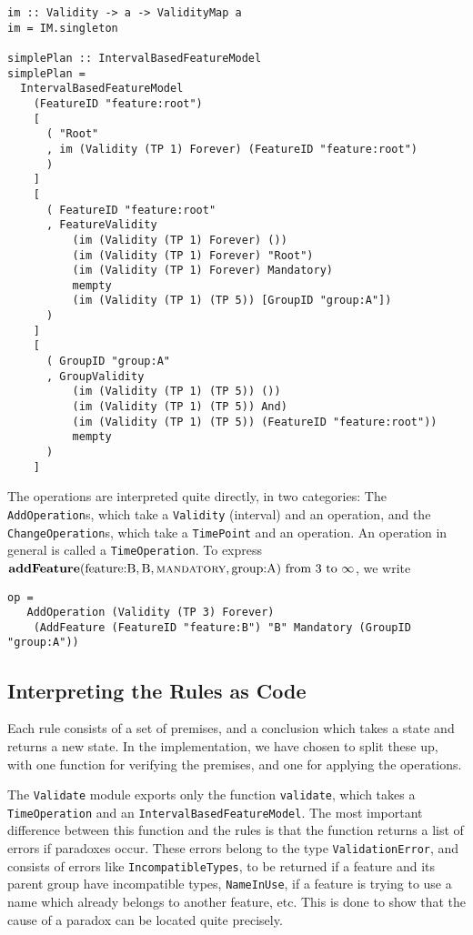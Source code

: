 \begin{verbatim}
im :: Validity -> a -> ValidityMap a
im = IM.singleton

simplePlan :: IntervalBasedFeatureModel
simplePlan =
  IntervalBasedFeatureModel
    (FeatureID "feature:root")
    [
      ( "Root"
      , im (Validity (TP 1) Forever) (FeatureID "feature:root")
      )
    ]
    [
      ( FeatureID "feature:root"
      , FeatureValidity
          (im (Validity (TP 1) Forever) ())
          (im (Validity (TP 1) Forever) "Root")
          (im (Validity (TP 1) Forever) Mandatory)
          mempty
          (im (Validity (TP 1) (TP 5)) [GroupID "group:A"])
      )
    ]
    [
      ( GroupID "group:A"
      , GroupValidity
          (im (Validity (TP 1) (TP 5)) ())
          (im (Validity (TP 1) (TP 5)) And)
          (im (Validity (TP 1) (TP 5)) (FeatureID "feature:root"))
          mempty
      )
    ]

\end{verbatim}

The operations are interpreted quite directly, in two categories: The \texttt{Add\-Operation}s, which take a \texttt{Validity} (interval) and an operation, and the \texttt{Change\-Operation}s, which take a \texttt{TimePoint} and an operation. An operation in general is called a \texttt{Time\-Operation}. To express $\textbf{addFeature}(\text{feature:B}, \text{B}, \textsc{mandatory}{}, \text{group:A}) \text{ from } 3 \text{ to } \infty$, we write
\begin{verbatim}
op =
   AddOperation (Validity (TP 3) Forever)
    (AddFeature (FeatureID "feature:B") "B" Mandatory (GroupID "group:A"))
\end{verbatim}


\subsection{Interpreting the Rules as Code}
Each rule consists of a set of premises, and a conclusion which takes a state and returns a new state. In the implementation, we have chosen to split these up, with one function for verifying the premises, and one for applying the operations.

The \texttt{Validate} module exports only the function \texttt{validate}, which takes a \texttt{Time\-Operation} and an \texttt{Interval\-Based\-Feature\-Model}. The most important difference between this function and the rules is that the function returns a list of errors if paradoxes occur. These errors belong to the type \texttt{Validation\-Error}, and consists of errors like \texttt{Incompatible\-Types}, to be returned if a feature and its parent group have incompatible types, \texttt{Name\-In\-Use}, if a feature is trying to use a name which already belongs to another feature, etc. This is done to show that the cause of a paradox can be located quite precisely.

